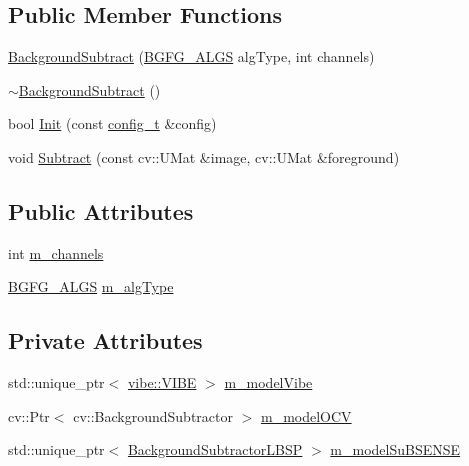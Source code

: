 \subsection*{Public Member Functions}
\begin{DoxyCompactItemize}
\item 
\mbox{\hyperlink{class_background_subtract_a0b5096a3823c7af66b6d22cdd36e8fda}{Background\+Subtract}} (\mbox{\hyperlink{class_background_subtract_a56850081696df68b55f87b4f3d87949f}{B\+G\+F\+G\+\_\+\+A\+L\+GS}} alg\+Type, int channels)
\item 
\mbox{\hyperlink{class_background_subtract_ac811f4c717052b81d1e0bd633d265423}{$\sim$\+Background\+Subtract}} ()
\item 
bool \mbox{\hyperlink{class_background_subtract_a9dacb4cc5cf41c4a37cc776a8142aecc}{Init}} (const \mbox{\hyperlink{defines_8h_a81d657237a541d02f8eeefdd40191920}{config\+\_\+t}} \&config)
\item 
void \mbox{\hyperlink{class_background_subtract_a1cd989730164da1c2523975d2ed32147}{Subtract}} (const cv\+::\+U\+Mat \&image, cv\+::\+U\+Mat \&foreground)
\end{DoxyCompactItemize}
\subsection*{Public Attributes}
\begin{DoxyCompactItemize}
\item 
int \mbox{\hyperlink{class_background_subtract_a676897a571788e0fee84d568bc68caf0}{m\+\_\+channels}}
\item 
\mbox{\hyperlink{class_background_subtract_a56850081696df68b55f87b4f3d87949f}{B\+G\+F\+G\+\_\+\+A\+L\+GS}} \mbox{\hyperlink{class_background_subtract_a3d569052b6954fa87f04a0aa8a970f97}{m\+\_\+alg\+Type}}
\end{DoxyCompactItemize}
\subsection*{Private Attributes}
\begin{DoxyCompactItemize}
\item 
std\+::unique\+\_\+ptr$<$ \mbox{\hyperlink{classvibe_1_1_v_i_b_e}{vibe\+::\+V\+I\+BE}} $>$ \mbox{\hyperlink{class_background_subtract_a57c251abeed9a2c73a3c97d0f7f8b527}{m\+\_\+model\+Vibe}}
\item 
cv\+::\+Ptr$<$ cv\+::\+Background\+Subtractor $>$ \mbox{\hyperlink{class_background_subtract_a80782a38138a430437095f625603e599}{m\+\_\+model\+O\+CV}}
\item 
std\+::unique\+\_\+ptr$<$ \mbox{\hyperlink{class_background_subtractor_l_b_s_p}{Background\+Subtractor\+L\+B\+SP}} $>$ \mbox{\hyperlink{class_background_subtract_a56275963c8cacca97b97d0cde884f4c1}{m\+\_\+model\+Su\+B\+S\+E\+N\+SE}}
\end{DoxyCompactItemize}


